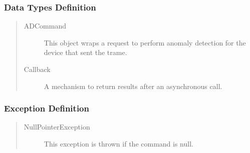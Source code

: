 \subsubsection{Data Types Definition}

\begin{quote}
	\begin{description}
		\item[ADCommand] This object wraps a request to perform anomaly detection for
		the device that sent the trame.	
		\item[Callback] A mechanism to return results after an asynchronous call. 
	\end{description} 
\end{quote}

\subsubsection{Exception Definition}

\begin{quote}
	\begin{description}
		\item[NullPointerException] This exception is thrown if the command is null.
	\end{description} 
\end{quote}